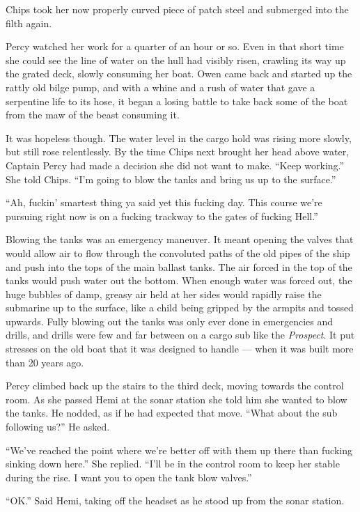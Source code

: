 \documentclass[]{article}
\begin{document}
\begin{multicols}{2}
Chips took her now properly curved piece of patch steel and submerged
into the filth again.

Percy watched her work for a quarter of an hour or so. Even in that
short time she could see the line of water on the hull had visibly
risen, crawling its way up the grated deck, slowly consuming her boat.
Owen came back and started up the rattly old bilge pump, and with a
whine and a rush of water that gave a serpentine life to its hose, it
began a losing battle to take back some of the boat from the maw of the
beast consuming it.

It was hopeless though. The water level in the cargo hold was rising
more slowly, but still rose relentlessly. By the time Chips next brought
her head above water, Captain Percy had made a decision she did not want
to make. ``Keep working.'' She told Chips. ``I'm going to blow the tanks
and bring us up to the surface.''

``Ah, fuckin' smartest thing ya said yet this fucking day. This course
we're pursuing right now is on a fucking trackway to the gates of
fucking Hell.''

Blowing the tanks was an emergency maneuver. It meant opening the valves
that would allow air to flow through the convoluted paths of the old
pipes of the ship and push into the tops of the main ballast tanks. The
air forced in the top of the tanks would push water out the bottom. When
enough water was forced out, the huge bubbles of damp, greasy air held
at her sides would rapidly raise the submarine up to the surface, like a
child being gripped by the armpits and tossed upwards. Fully blowing out
the tanks was only ever done in emergencies and drills, and drills were
few and far between on a cargo sub like the \emph{Prospect}. It put
stresses on the old boat that it was designed to handle --- when it was
built more than 20 years ago.

Percy climbed back up the stairs to the third deck, moving towards the
control room. As she passed Hemi at the sonar station she told him she
wanted to blow the tanks. He nodded, as if he had expected that move.
``What about the sub following us?'' He asked.

``We've reached the point where we're better off with them up there than
fucking sinking down here.'' She replied. ``I'll be in the control room
to keep her stable during the rise. I want you to open the tank blow
valves.''

``OK.'' Said Hemi, taking off the headset as he stood up from the sonar
station.


\end{multicols}
\end{document}
